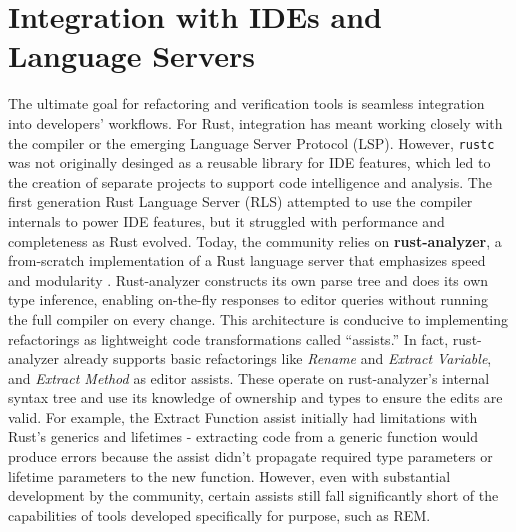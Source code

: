 \section{Integration with IDEs and Language Servers}
\label{sec:integration_language_server}
The ultimate goal for refactoring and verification tools is seamless integration
into developers' workflows. For Rust, integration has meant working closely with
the compiler or the emerging Language Server Protocol (LSP). However,
\texttt{rustc} was not originally desinged as a reusable library for IDE
features, which led to the creation of separate projects to support code
intelligence and analysis. The first generation Rust Language Server (RLS)
attempted to use the compiler internals to power IDE features, but it struggled
with performance and completeness as Rust evolved. Today, the community relies
on \textbf{rust-analyzer}, a from-scratch implementation of a Rust language
server that emphasizes speed and modularity \cite{Schiedt_2022}. Rust-analyzer
constructs its own parse tree and does its own type inference, enabling
on-the-fly responses to editor queries without running the full compiler on
every change. This architecture is conducive to implementing refactorings as
lightweight code transformations called “assists.” In fact, rust-analyzer
already supports basic refactorings like \textit{Rename} and \textit{Extract
Variable}, and \textit{Extract Method} as editor assists. These operate on
rust-analyzer's internal syntax tree and use its knowledge of ownership and
types to ensure the edits are valid. For example, the Extract Function assist
initially had limitations with Rust's generics and lifetimes - extracting code
from a generic function would produce errors because the assist didn't propagate
required type parameters or lifetime parameters to the new function. However,
even with substantial development by the community, certain assists still fall
significantly short of the capabilities of tools developed specifically for
purpose, such as REM.

